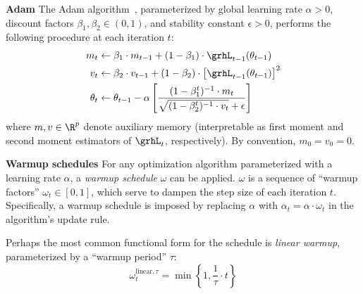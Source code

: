 {\textbf{Adam} \quad The Adam algorithm~\citep{kingma2014adam}, parameterized by global learning rate $\alpha > 0$, discount factors $\beta_1, \beta_2 \in (0, 1)$, and stability constant $\epsilon > 0$, performs the following procedure at each iteration $t$:
\begin{align}
    m_t &\leftarrow \beta_1 \cdot m_{t - 1} + (1 - \beta_1) \cdot \grhL_{t - 1}(\theta_{t - 1}) \label{eqn:adam-first-moment-update} \\
    v_t &\leftarrow \beta_2 \cdot v_{t - 1} + (1 - \beta_2) \cdot \left[ \grhL_{t - 1}(\theta_{t - 1}) \right]^2 \label{eqn:adam-second-moment-update} \\
    \theta_t &\leftarrow \theta_{t - 1} - \alpha \left[ \frac{(1 - \beta_1^t)^{-1} \cdot m_t}{\sqrt{(1 - \beta_2^t)^{-1} \cdot v_t} + \epsilon} \right] \label{eqn:adam-update-rule}
\end{align}
where $m, v \in \R^p$ denote auxiliary memory (interpretable as first moment and second moment estimators of $\grhL_t$, respectively). By convention, $m_0 = v_0 = 0$.

\textbf{Warmup schedules} \quad For any optimization algorithm parameterized with a learning rate $\alpha$, a \emph{warmup schedule} $\omega$ can be applied. $\omega$ is a sequence of ``warmup factors'' $\omega_t \in [0, 1]$, which serve to dampen the step size of each iteration $t$. Specifically, a warmup schedule is imposed by replacing $\alpha$ with $\alpha_t = \alpha \cdot \omega_t$ in the algorithm's update rule.

Perhaps the most common functional form for the schedule is \emph{linear warmup}, parameterized by a ``warmup period'' $\tau$:
\begin{equation}
    \omega_t^{\text{linear}, \tau} = \min \left\{ 1, \frac{1}{\tau} \cdot t \right\}
\end{equation}

}
